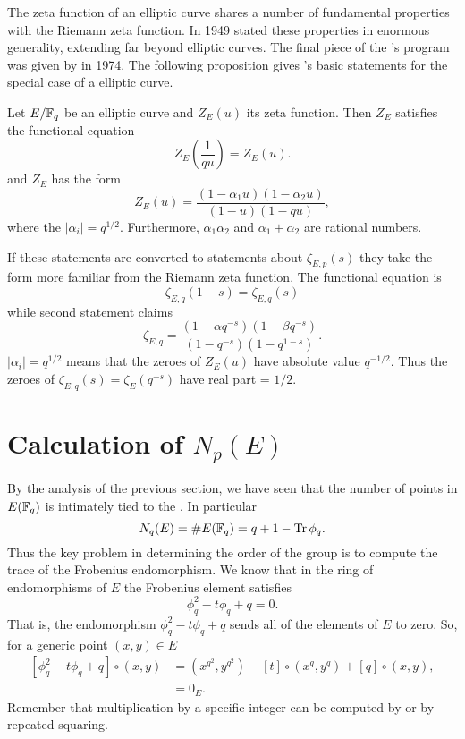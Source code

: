 The zeta function of an elliptic curve shares a number of fundamental
properties with the Riemann zeta function.  In 1949 {\Weil} stated
these properties in enormous generality, extending far beyond elliptic
curves.  The final piece of the {\Weil}'s program was given by
{\Deligne} in 1974.  The following proposition gives {\Weil}'s basic
statements for the special case of a elliptic curve.

\begin{proposition} \label{Ell:Weil:Conject:Prop}
Let $E/\mathbb{F}_q$ be an elliptic curve and $Z_E(u)$ its zeta function.
Then $Z_E$ satisfies the functional equation
\[
Z_E(\frac{1}{q u}) =  Z_E(u).
\]
and $Z_E$ has the form
\[
Z_E(u) = \frac{(1 - \alpha_1 u) (1 - \alpha_2 u)}{(1 - u)(1 - q u)},
\]
where the $|\alpha_i| = q^{1/2}$.  Furthermore, $\alpha_1 \alpha_2$
and $\alpha_1 + \alpha_2$ are rational numbers.
\end{proposition}

If these statements are converted to statements about $\zeta_{E,p}(s)$
they take the form more familiar from the Riemann zeta function.  The
functional equation is
\[
\zeta_{E,q}(1 - s) = \zeta_{E,q}(s)
\]
while second statement claims 
\[
\zeta_{E,q} = \frac{(1 - \alpha q^{-s}) (1 - \beta q^{-s})}{(1 - q^{-s})(1 - q^{1-s})}.
\]
$|\alpha_i| = q^{1/2}$ means that the zeroes of $Z_E(u)$ have
absolute value $q^{-1/2}$.  Thus the zeroes of $\zeta_{E,q}(s) =
\zeta_E(q^{-s})$ have real part = $1/2$.

\section{Calculation of $N_p(E)$}
\label{Elliptic:Order:Sec}

By the analysis of the previous section, we have seen that the number
of points in $E(\mathbb{F}_q)$ is intimately tied to the .  In particular 
\[
N_q(E) = \#E(\mathbb{F}_q) = q + 1 - \mathop{\rm Tr}\nolimits \phi_q.
\]
Thus the key problem in determining the order of the group is to
compute the trace of the Frobenius endomorphism.  We know that in the
ring of endomorphisms of $E$ the Frobenius element satisfies
\[
\phi_q^2 - t \phi_q + q = 0.
\]
That is, the endomorphism $\phi_q^2 - t \phi_q + q$ sends all of the
elements of $E$ to zero.  So, for a generic point $(x,y) \in E$
\begin{equation} \label{Ell:Trace:Null:Eq}
\begin{aligned}
[\phi_q^2 - t \phi_q + q] \circ (x, y) 
  & = (x^{q^2}, y^{q^2}) - [t]\circ(x^q, y^q) + [q] \circ (x, y), \\
  & = 0_E.
\end{aligned}
\end{equation}
Remember that multiplication by a specific integer can be computed by
 or by repeated squaring.

